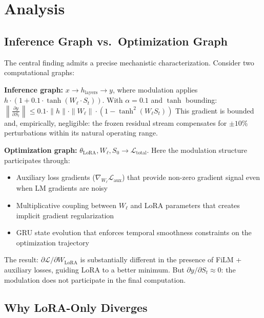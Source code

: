 \documentclass[11pt,a4paper]{article}
\begin{document}
\section{Analysis}

\subsection{Inference Graph vs.\ Optimization Graph}

The central finding admits a precise mechanistic characterization. Consider two
computational graphs:

\textbf{Inference graph:} $x \to h_{\mathrm{layers}} \to y$, where modulation
applies $h \cdot (1 + 0.1 \cdot \tanh(W_\ell \cdot S_t))$. With $\alpha = 0.1$
and $\tanh$ bounding:
$\left\|\frac{\partial y}{\partial S_t}\right\| \leq 0.1 \cdot \|h\| \cdot \|W_\ell\| \cdot (1 - \tanh^2(W_\ell S_t))$
This gradient is bounded and, empirically, negligible: the frozen residual stream
compensates for $\pm 10\%$ perturbations within its natural operating range.

\textbf{Optimization graph:} $\theta_{\mathrm{LoRA}}, W_\ell, S_0 \to
\mathcal{L}_\mathrm{total}$. Here the modulation structure participates through:
\begin{itemize}
  \item Auxiliary loss gradients ($\nabla_{W_\ell} \mathcal{L}_\mathrm{aux}$) that
    provide non-zero gradient signal even when LM gradients are noisy
  \item Multiplicative coupling between $W_\ell$ and LoRA parameters that creates
    implicit gradient regularization
  \item GRU state evolution that enforces temporal smoothness constraints on the
    optimization trajectory
\end{itemize}

The result: $\partial \mathcal{L} / \partial W_{\mathrm{LoRA}}$ is substantially
different in the presence of FiLM + auxiliary losses, guiding LoRA to a better
minimum. But $\partial y / \partial S_t \approx 0$: the modulation does not
participate in the final computation.

\subsection{Why LoRA-Only Diverges}
\end{document}

